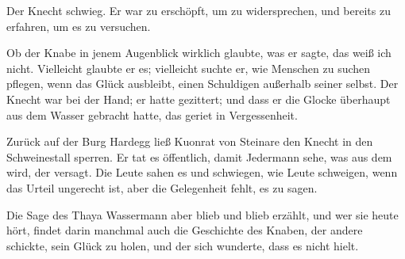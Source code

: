 Der \gls{Knecht} schwieg. Er war zu erschöpft, um zu widersprechen, und bereits zu erfahren, um es zu versuchen.

Ob der Knabe in jenem Augenblick wirklich glaubte, was er sagte, das weiß ich nicht. Vielleicht glaubte er es; vielleicht suchte er, wie Menschen zu suchen pflegen, wenn das Glück ausbleibt, einen Schuldigen außerhalb seiner selbst. Der \gls{Knecht} war bei der Hand; er hatte gezittert; und dass er die Glocke überhaupt aus dem Wasser gebracht hatte, das geriet in Vergessenheit.

Zurück auf der Burg \gls{Hardegg} ließ \gls{Kuonrat von Steinare} den \gls{Knecht} in den Schweinestall sperren. Er tat es öffentlich, damit Jedermann sehe, was aus dem wird, der versagt. Die Leute sahen es und schwiegen, wie Leute schweigen, wenn das Urteil ungerecht ist, aber die Gelegenheit fehlt, es zu sagen.

Die Sage des \gls{Thaya Wassermann} aber blieb und blieb erzählt, und wer sie heute hört, findet darin manchmal auch die Geschichte des Knaben, der andere schickte, sein Glück zu holen, und der sich wunderte, dass es nicht hielt.
